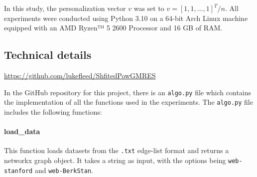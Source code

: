 \noindent In this study, the personalization vector $v$ was set to $v = [1, 1, ... , 1]^T/n$. All experiments were conducted using Python 3.10 on a 64-bit Arch Linux machine equipped with an AMD Ryzen™ 5 2600 Processor and 16 GB of RAM.

\subsection{Technical details}

\begin{problem}
    \centering
    \url{https://github.com/lukefleed/ShfitedPowGMRES}
\end{problem}

\noindent In the GitHub repository for this project, there is an \texttt{algo.py} file which contains the implementation of all the functions used in the experiments. The \texttt{algo.py} file includes the following functions:

\paragraph{load\_data} This function loads datasets from the \texttt{.txt} edge-list format and returns a networkx graph object. It takes a string as input, with the options being \texttt{web-stanford} and \texttt{web-BerkStan}.

